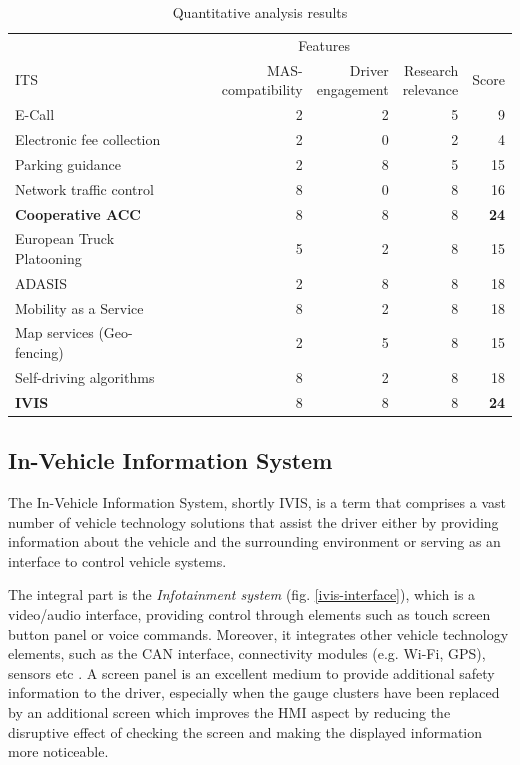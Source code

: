 \documentclass[main.tex]{subfiles}
\begin{document}
\begin{table}[htbp]
    \caption{Quantitative analysis results}
    \renewcommand{\arraystretch}{1.4}
    \centering\begin{tabular}{l*{3}{r}r} \toprule
         & \multicolumn{3}{c}{Features} & \\ \cmidrule(rl){2-4}
        ITS & \multicolumn{1}{p{6em}}{MAS-compatibility} & \multicolumn{1}{p{6em}}{Driver \newline engagement} & \multicolumn{1}{p{6em}}{Research \newline relevance} & Score \\ \midrule
        E-Call & 2 & 2 & 5 & 9 \\ 
        Electronic fee collection & 2 & 0 & 2 & 4 \\
        Parking guidance & 2 & 8 & 5 & 15 \\
        Network traffic control & 8 & 0 & 8 & 16 \\
        \textbf{Cooperative ACC} & 8 & 8 & 8 & \textbf{24} \\
        European Truck Platooning & 5 & 2 & 8 & 15 \\
        ADASIS & 2 & 8 & 8 & 18 \\
        Mobility as a Service & 8 & 2 & 8 & 18 \\
        Map services (Geo-fencing) & 2 & 5 & 8 & 15 \\
        \multicolumn{1}{p{5em}}{Self-driving algorithms} \& Platooning & 8 & 2 & 8 & 18 \\
        \textbf{IVIS} & 8 & 8 & 8 & \textbf{24} \\ \bottomrule
    \end{tabular}
    \label{qa-table}
\end{table}
\clearpage 

\subsection{In-Vehicle Information System}

The In-Vehicle Information System, shortly IVIS, is a term that comprises a vast number of vehicle technology 
solutions that assist the driver either by providing information about the vehicle and the surrounding environment 
or serving as an interface to control vehicle systems. 

The integral part is the \emph{Infotainment system} (fig. \ref{ivis-interface}), which is a
video/audio interface, providing control through elements such as touch screen button panel or
voice commands.  Moreover, it integrates other vehicle technology elements, such as the CAN
interface, connectivity modules (e.g. Wi-Fi, GPS), sensors etc \cite{Saxena}. A screen panel is
an excellent medium to provide additional safety information to the driver, especially when the
gauge clusters have been replaced by an additional screen which improves the HMI aspect by
reducing the disruptive effect of checking the screen and making the displayed information more
noticeable. 
\end{document}
